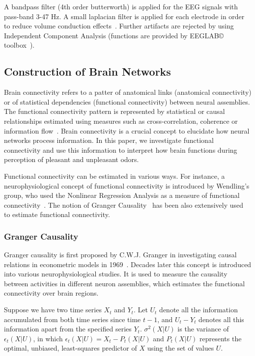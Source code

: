 A bandpass filter (4th order butterworth) is applied for the EEG signals with pass-band 3-47 Hz. A small laplacian filter is applied for each electrode in order to reduce volume conduction effects~\cite{wolters2007volume}. Further artifacts are rejected by using Independent Component Analysis (functions are provided by EEGLAB\copyright~ toolbox~\cite{luck2014introduction}). 

\subsection{Construction of Brain Networks}
Brain connectivity refers to a patter of anatomical links (anatomical connectivity) or of statistical dependencies (functional connectivity) between neural assemblies. The functional connectivity pattern is represented by statistical or causal relationships estimated using measures such as cross-correlation, coherence or information flow~\cite{sporns2007brain}. Brain connectivity is a crucial concept to elucidate how neural networks process information. In this paper, we investigate functional connectivity and use this information to interpret how brain functions during perception of pleasant and unpleasant odors. 

Functional connectivity can be estimated in various ways. For instance, a neurophysiological concept of functional connectivity is introduced by Wendling's group, who used the Nonlinear Regression Analysis as a measure of functional connectivity~\cite{bettus2008enhanced}. The notion of Granger Causality~\cite{roebroeck2005mapping} has been also extensively used to estimate functional connectivity. 

\subsubsection{Granger Causality}
Granger causality is first proposed by C.W.J. Granger in investigating causal relations in econometric models in 1969~\cite{granger1969investigating}. Decades later this concept is introduced into various neurophysiological studies. It is used to measure the causality between activities in different neuron assemblies, which estimates the functional connectivity over brain regions. 

Suppose we have two time series $X_t$ and $Y_t$. Let $U_t$ denote all the information accumulated from both time series since time $t-1$, and $U_t-Y_t$ denotes all this information apart from the specified series $Y_t$. $\sigma^2(X|U)$ is the variance of $\epsilon_t(X|U)$, in which $\epsilon_t(X|U)=X_t-P_t(X|U)$ and $P_t(X|U)$ represents the optimal, unbiased, least-squares predictor of $X$ using the set of values $U$.

